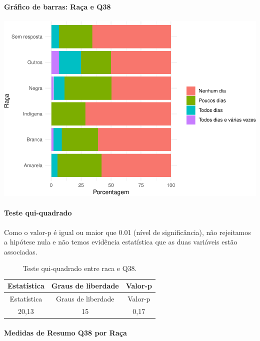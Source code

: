 \documentclass[]{article}
\let\oldparagraph\paragraph
\renewcommand{\paragraph}[1]{\oldparagraph{#1}\mbox{}}
\begin{document}
\hypertarget{gruxe1fico-de-barras-rauxe7a-e-q38}{%
\paragraph{Gráfico de barras: Raça e Q38}\label{gruxe1fico-de-barras-rauxe7a-e-q38}}

\begin{center}\includegraphics[width=0.75\linewidth]{relatorio_covid19_files/figure-latex/unnamed-chunk-1459-1} \end{center}

\hypertarget{teste-qui-quadrado-125}{%
\paragraph{Teste qui-quadrado}\label{teste-qui-quadrado-125}}

Como o valor-p é igual ou maior que 0.01 (nível de significância), não rejeitamos a hipótese nula e não temos evidência estatística que as duas variáveis estão associadas.

\begin{longtable}[]{@{}ccc@{}}
\caption{\label{tab:unnamed-chunk-1461}Teste qui-quadrado entre raca e Q38.}\tabularnewline
\toprule
Estatística & Graus de liberdade & Valor-p\tabularnewline
\midrule
\endfirsthead
\toprule
Estatística & Graus de liberdade & Valor-p\tabularnewline
\midrule
\endhead
20,13 & 15 & 0,17\tabularnewline
\bottomrule
\end{longtable}

\cleardoublepage

\hypertarget{medidas-de-resumo-q38-por-rauxe7a}{%
\paragraph{Medidas de Resumo Q38 por Raça}\label{medidas-de-resumo-q38-por-rauxe7a}}
\end{document}

